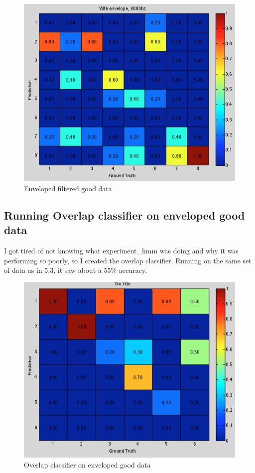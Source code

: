 \documentclass[12pt]{article}
\begin{document}
\begin{figure}[h!]
\centering
\includegraphics[scale=0.6]{envelopedhmm.png}
\caption{Enveloped filtered good data}
\end{figure}

\FloatBarrier
\subsection{Running Overlap classifier on enveloped good data}
I got tired of not knowing what experiment\_hmm was doing and why it was performing so poorly, so I created the overlap classifier. Running on the same set of data as in 5.3, it saw about a 55\% accuracy.

\begin{figure}[h!]
\centering
\includegraphics[scale=0.6]{overlapinit.png}
\caption{Overlap classifier on enveloped good data}
\end{figure}
\end{document}

